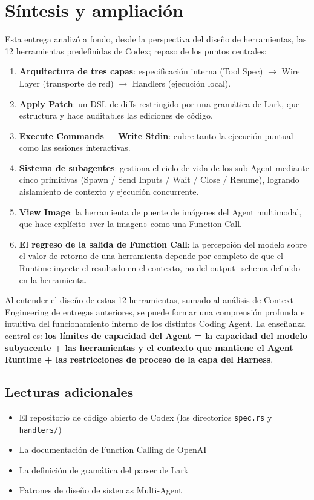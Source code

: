 \section{Síntesis y ampliación}

Esta entrega analizó a fondo, desde la perspectiva del diseño de herramientas, las 12 herramientas predefinidas de Codex; repaso de los puntos centrales:

\begin{enumerate}
    \item \textbf{Arquitectura de tres capas}: especificación interna (Tool Spec) $\rightarrow$ Wire Layer (transporte de red) $\rightarrow$ Handlers (ejecución local).
    \item \textbf{Apply Patch}: un DSL de diffs restringido por una gramática de Lark, que estructura y hace auditables las ediciones de código.
    \item \textbf{Execute Commands + Write Stdin}: cubre tanto la ejecución puntual como las sesiones interactivas.
    \item \textbf{Sistema de subagentes}: gestiona el ciclo de vida de los sub-Agent mediante cinco primitivas (Spawn / Send Inputs / Wait / Close / Resume), logrando aislamiento de contexto y ejecución concurrente.
    \item \textbf{View Image}: la herramienta de puente de imágenes del Agent multimodal, que hace explícito «ver la imagen» como una Function Call.
    \item \textbf{El regreso de la salida de Function Call}: la percepción del modelo sobre el valor de retorno de una herramienta depende por completo de que el Runtime inyecte el resultado en el contexto, no del output\_schema definido en la herramienta.
\end{enumerate}

Al entender el diseño de estas 12 herramientas, sumado al análisis de Context Engineering de entregas anteriores, se puede formar una comprensión profunda e intuitiva del funcionamiento interno de los distintos Coding Agent. La enseñanza central es: \textbf{los límites de capacidad del Agent = la capacidad del modelo subyacente + las herramientas y el contexto que mantiene el Agent Runtime + las restricciones de proceso de la capa del Harness}.

\subsection{Lecturas adicionales}

\begin{itemize}
    \item El repositorio de código abierto de Codex (los directorios \texttt{spec.rs} y \texttt{handlers/})
    \item La documentación de Function Calling de OpenAI
    \item La definición de gramática del parser de Lark
    \item Patrones de diseño de sistemas Multi-Agent
\end{itemize}



